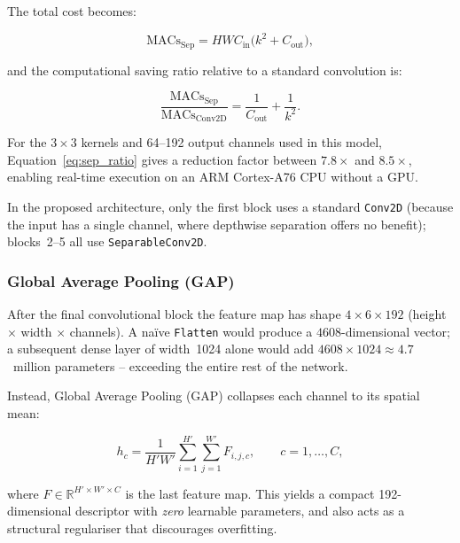The total cost becomes:

\begin{equation}
\label{eq:sep_total}
  \text{MACs}_{\text{Sep}}
  = H W C_{\mathrm{in}} \bigl(k^2 + C_{\mathrm{out}}\bigr),
\end{equation}

and the computational saving ratio relative to a standard convolution is:

\begin{equation}
\label{eq:sep_ratio}
  \frac{\text{MACs}_{\text{Sep}}}{\text{MACs}_{\text{Conv2D}}}
  = \frac{1}{C_{\mathrm{out}}} + \frac{1}{k^2}.
\end{equation}

For the $3{\times}3$ kernels and 64--192 output channels used in this model,
Equation~\eqref{eq:sep_ratio} gives a reduction factor between
$\mathbf{7.8\times}$ and $\mathbf{8.5\times}$, enabling real-time execution
on an ARM Cortex-A76 CPU without a GPU.

In the proposed architecture, only the first block uses a standard
\texttt{Conv2D} (because the input has a single channel, where depthwise
separation offers no benefit); blocks~2--5 all use \texttt{SeparableConv2D}.

\subsubsection{Global Average Pooling (GAP)}
\label{sec:gap}

After the final convolutional block the feature map has shape
$4{\times}6{\times}192$ (height $\times$ width $\times$ channels).
A na\"ive \texttt{Flatten} would produce a $4608$-dimensional vector; a
subsequent dense layer of width~1024 alone would add
$4608 \times 1024 \approx 4.7$~million parameters -- exceeding the entire
rest of the network.

Instead, {Global Average Pooling} (GAP) collapses each channel to its
spatial mean:

\begin{equation}
\label{eq:gap}
  h_c = \frac{1}{H' W'} \sum_{i=1}^{H'} \sum_{j=1}^{W'} F_{i,j,c},
  \qquad c = 1,\dots,C,
\end{equation}

where $F \in \mathbb{R}^{H' \times W' \times C}$ is the last feature map.
This yields a compact 192-dimensional descriptor with \emph{zero} learnable
parameters, and also acts as a structural regulariser that discourages
overfitting.

